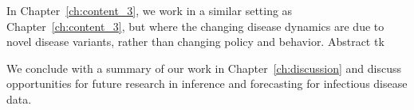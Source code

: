 In Chapter~\ref{ch:content_3}, we work in a similar setting as Chapter~\ref{ch:content_3}, but where the changing disease dynamics are due to novel disease variants, rather than changing policy and behavior.
Abstract tk

We conclude with a summary of our work in Chapter~\ref{ch:discussion} and discuss opportunities for future research in inference and forecasting for infectious disease data.

\label{sec:thesis_contributions}









